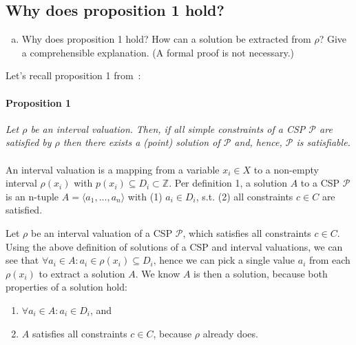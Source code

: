 \subsection{Why does proposition 1 hold?}\label{ssec:prop1}

\begin{enumerate}[(a)]
\item Why does proposition 1 hold? How can a solution be extracted from $\rho$? Give a comprehensible explanation. (A formal proof is not necessary.)
\end{enumerate}
Let's recall proposition 1 from~\cite{MF19}:

\paragraph{Proposition 1}
\emph{Let $\rho$ be an interval valuation.}
\emph{Then, if all simple constraints of a CSP $\mathcal{P}$ are satisfied by $\rho$ then there exists a (point) solution of $\mathcal{P}$ and, hence, $\mathcal{P}$ is satisfiable.}


\paragraph{}
An interval valuation is a mapping from a variable $x_i \in X$ to a non-empty interval $\rho(x_i)$ with $p(x_i) \subseteq D_i \subset \mathbb{Z}$.
Per definition 1, a solution $A$ to a CSP $\mathcal{P}$ is an n-tuple $A = \langle a_1, ..., a_n \rangle$ with (1) $a_i \in D_i$, s.t. (2) all constraints $c \in C$ are satisfied.~\cite{MF19}

Let $\rho$ be an interval valuation of a CSP $\mathcal{P}$, which satisfies all constraints $c \in C$.
Using the above definition of solutions of a CSP and interval valuations, we can see that $\forall a_i \in A: a_i \in \rho(x_i) \subseteq D_i$, hence we can pick a single value $a_i$ from each $\rho(x_i)$ to extract a solution $A$.
We know $A$ is then a solution, because both properties of a solution hold:

\begin{enumerate}[(1)]
    \item $\forall a_i \in A: a_i \in D_i$, and
    \item $A$ satisfies all constraints $c \in C$, because $\rho$ already does.
\end{enumerate}
